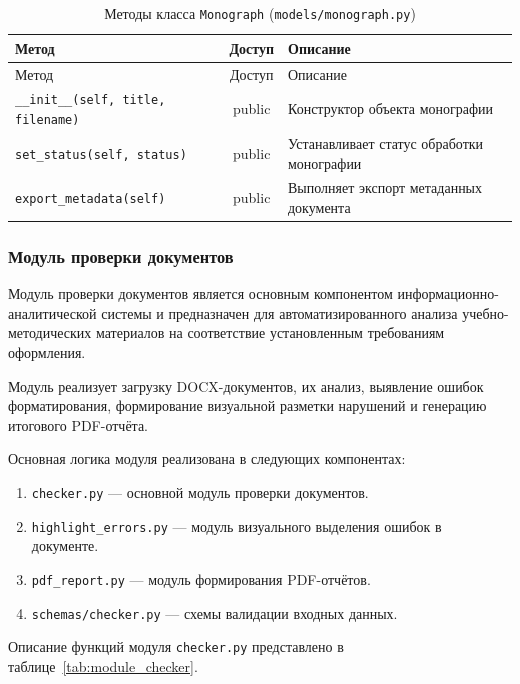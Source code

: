 \begin{xltabular}{\textwidth}{|>{\raggedright\arraybackslash}p{6cm}|c|X|}
	\caption{Методы класса \texttt{Monograph} (\texttt{models/monograph.py})\label{tab:class_monograph}}\\ \hline
	\centrow Метод & \centrow Доступ & \centrow Описание \\ \hline
	\endfirsthead
	\centrow Метод & \centrow Доступ & \centrow Описание \\ \hline
	\finishhead
	\texttt{\_\_init\_\_(self, title, filename)} & public & Конструктор объекта монографии \\ \hline
	\texttt{set\_status(self, status)} & public & Устанавливает статус обработки монографии \\ \hline
	\texttt{export\_metadata(self)} & public & Выполняет экспорт метаданных документа \\ \hline
\end{xltabular}

\subsubsection{Модуль проверки документов}

Модуль проверки документов является основным компонентом информационно-аналитической системы и предназначен для автоматизированного анализа учебно-методических материалов на соответствие установленным требованиям оформления.

Модуль реализует загрузку DOCX-документов, их анализ, выявление ошибок форматирования, формирование визуальной разметки нарушений и генерацию итогового PDF-отчёта.

Основная логика модуля реализована в следующих компонентах:
\begin{enumerate}
	\item \texttt{checker.py} — основной модуль проверки документов.
	
	\item \texttt{highlight\_errors.py} — модуль визуального выделения ошибок в документе.
	
	\item \texttt{pdf\_report.py} — модуль формирования PDF-отчётов.
	
	\item \texttt{schemas/checker.py} — схемы валидации входных данных.
\end{enumerate}

Описание функций модуля \texttt{checker.py} представлено в таблице~\ref{tab:module_checker}.

